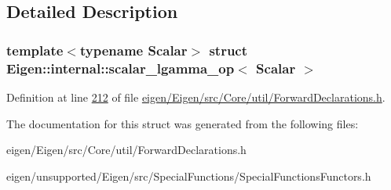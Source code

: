 \subsection{Detailed Description}
\subsubsection*{template$<$typename Scalar$>$\newline
struct Eigen\+::internal\+::scalar\+\_\+lgamma\+\_\+op$<$ Scalar $>$}



Definition at line \hyperlink{eigen_2_eigen_2src_2_core_2util_2_forward_declarations_8h_source_l00212}{212} of file \hyperlink{eigen_2_eigen_2src_2_core_2util_2_forward_declarations_8h_source}{eigen/\+Eigen/src/\+Core/util/\+Forward\+Declarations.\+h}.



The documentation for this struct was generated from the following files\+:\begin{DoxyCompactItemize}
\item 
eigen/\+Eigen/src/\+Core/util/\+Forward\+Declarations.\+h\item 
eigen/unsupported/\+Eigen/src/\+Special\+Functions/\+Special\+Functions\+Functors.\+h\end{DoxyCompactItemize}
